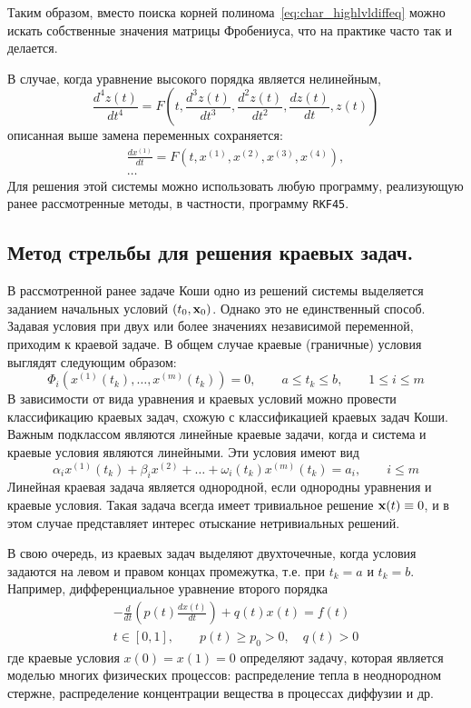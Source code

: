 Таким образом, вместо поиска корней полинома~\eqref{eq:char_highlvldiffeq} можно искать собственные значения
матрицы Фробениуса, что на практике часто так и делается.

В случае, когда уравнение высокого порядка является нелинейным,
\begin{equation*}
    \frac{d^4 z(t)}{dt^4} = F\left( t, \frac{d^3 z(t)}{dt^3}, \frac{d^2 z(t)}{dt^2}, \frac{dz(t)}{dt}, z(t) \right)
\end{equation*}
описанная выше замена переменных сохраняется:
\begin{gather*}
    \frac{dx^{(1)}}{dt} = F\left( t, x^{(1)}, x^{(2)}, x^{(3)}, x^{(4)} \right), \\
    \dots
\end{gather*}
Для решения этой системы можно использовать любую программу, реализующую ранее рассмотренные методы, в частности,
программу \verb|RKF45|.

\subsection{Метод стрельбы для решения краевых задач.}
В рассмотренной ранее задаче Коши одно из решений системы выделяется заданием начальных условий $(t_0, \bf{x}_0)$.
Однако это не единственный способ. Задавая условия при двух или более значениях независимой переменной, приходим к
краевой задаче. В общем случае краевые (граничные) условия выглядят следующим образом:
\begin{equation*}
    \Phi_i \left( x^{(1)}(t_k),\ldots, x^{(m)}(t_k) \right) = 0, \qquad a \leq t_k \leq b, \qquad 1 \leq i \leq m
\end{equation*}
В зависимости от вида уравнения и краевых условий можно провести классификацию краевых задач, схожую с классификацией
краевых задач Коши. Важным подклассом являются линейные краевые задачи, когда и система и краевые условия являются
линейными. Эти условия имеют вид
\begin{equation*}
    \alpha_i x^{(1)}(t_k) + \beta_i x^{(2)} + \ldots + \omega_i(t_k)x^{(m)}(t_k) = a_i, \qquad i \leq m
\end{equation*}
Линейная краевая задача является однородной, если однородны уравнения и краевые условия. Такая задача всегда имеет
тривиальное решение $\bf{x}(t) \equiv 0$, и в этом случае представляет интерес отыскание нетривиальных решений.

В свою очередь, из краевых задач выделяют двухточечные, когда условия задаются на левом и правом концах промежутка,
т.е. при $t_k = a$ и $t_k = b$. Например, дифференциальное уравнение второго порядка
\begin{gather*}
    -\frac{d}{dt} \left( p(t)\frac{dx(t)}{dt} \right) + q(t)x(t) = f(t)\\
    t \in [0, 1], \qquad p(t) \geq p_0 > 0, \quad q(t) > 0
\end{gather*}
где краевые условия $x(0) = x(1) = 0$ определяют задачу, которая является моделью многих физических процессов:
распределение тепла в неоднородном стержне, распределение концентрации вещества в процессах диффузии и др.

